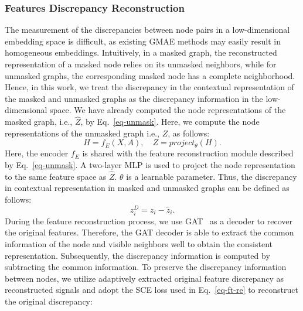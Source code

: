 \documentclass[sigconf]{acmart}
\begin{document}
\subsubsection{Features Discrepancy Reconstruction}
The measurement of the discrepancies between node pairs in a low-dimensional embedding space is difficult, as existing GMAE methods may easily result in homogeneous embeddings. Intuitively, in a masked graph, the reconstructed representation of a masked node relies on its unmasked neighbors, while for unmasked graphs, the corresponding masked node has a complete neighborhood. Hence, in this work, we treat the discrepancy in the contextual representation of the masked and unmasked graphs as the discrepancy information in the low-dimensional space. We have already computed the node representations of the masked graph, i.e., $\hat{Z}$, by Eq.~\ref{eq-unmask}. Here, we compute the node representations of the unmasked graph i.e., $Z$, as follows: 
\begin{equation}
    H = f_E(X,A), \quad Z =project_\theta(H).
\end{equation}
Here, the encoder $f_E$ is shared with the feature reconstruction module described by Eq.~\ref{eq-unmask}. A two-layer MLP is used to project the node representation to the same feature space as $\hat{Z}$. $\theta$ is a learnable parameter. Thus, the discrepancy in contextual representation in masked and unmasked graphs can be defined as follows:
\begin{equation}
    z^D_i = z_i - \hat{z}_i.
\end{equation}
During the feature reconstruction process,  we use GAT~\cite{gat} as a decoder to recover the original features. Therefore, the GAT decoder is able to extract the common information of the node and visible neighbors well to obtain the consistent representation. Subsequently, the discrepancy information is computed by subtracting the common information.
To preserve the discrepancy information between nodes, we utilize adaptively extracted original feature discrepancy as reconstructed signals and adopt the SCE loss used in Eq.~\ref{eq-ft-re} to reconstruct the original discrepancy:
\end{document}
